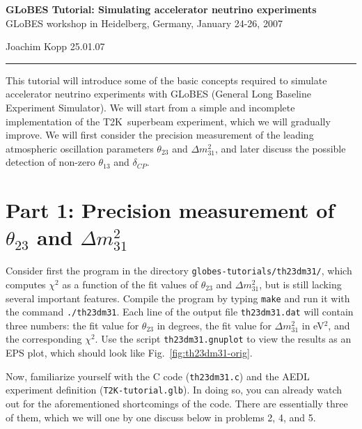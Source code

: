 \documentclass[12pt,a4paper]{article}
\newcommand{\ldm}{\ensuremath{{\Delta m_{31}^2}}}          %
\newcommand{\TtoK}{{\sffamily T2K}}
\newcommand{\aufg}[2]{\vspace{4mm}{\bf\underline{Problem #1:} {#2}} \vspace{3mm}}
\theoremstyle{dotless}
\begin{document}
\vspace*{-3cm}
\begin{center}
{\large\bf GLoBES Tutorial: Simulating accelerator neutrino experiments}\\[0.3cm]
GLoBES workshop in Heidelberg, Germany, January 24-26, 2007
\end{center}
\vspace*{2mm}

Joachim Kopp \hfill 25.01.07

\bigskip
\hrule
\vspace*{4mm}

{\small
This tutorial will introduce some of the basic concepts required to simulate
accelerator neutrino experiments with GLoBES (General Long Baseline Experiment
Simulator). We will start from a simple and incomplete implementation of the
\TtoK\ superbeam experiment, which we will gradually improve. We will first consider
the precision measurement of the leading atmospheric oscillation parameters
$\theta_{23}$ and $\ldm$, and later discuss the possible detection of
non-zero $\theta_{13}$ and $\delta_{CP}$.
}


\section*{Part 1: Precision measurement of $\theta_{23}$ and $\ldm$}

\aufg{1}{Warm-up}

Consider first the program in the directory {\tt globes-tutorials/th23dm31/},
which computes $\chi^2$ as a function of the fit values of $\theta_{23}$
and $\ldm$, but is still lacking several important features. Compile
the program by typing {\tt make} and run it with the command {\tt ./th23dm31}.
Each line of the output file {\tt th23dm31.dat} will contain three numbers:
the fit value for $\theta_{23}$ in degrees, the fit value for $\ldm$ in eV$^2$,
and the corresponding $\chi^2$. Use the script {\tt th23dm31.gnuplot}
to view the results as an EPS plot, which should look like
Fig.~\ref{fig:th23dm31-orig}.

Now, familiarize yourself with the C code ({\tt th23dm31.c}) and the AEDL
experiment definition ({\tt T2K-tutorial.glb}). In doing so, you
can already watch out for the aforementioned shortcomings of the code.
There are essentially three of them, which we will one by one discuss
below in problems 2, 4, and 5.
\end{document}
